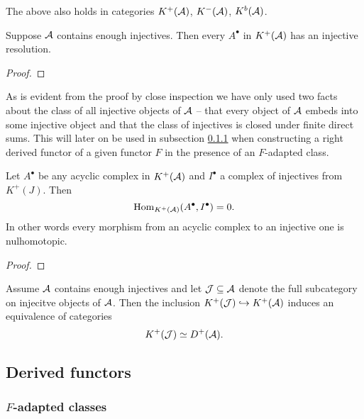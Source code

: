 The above also holds in categories $K^+(\mathcal A)$, $K^-(\mathcal A)$, $K^b(\mathcal A)$.

\begin{proposition}
    \label{injective resolution}
    Suppose $\mathcal A$ contains enough injectives. Then every $A^\bullet$ in $K^+(\mathcal A)$ has an injective resolution.
\end{proposition}

\begin{proof}
    
\end{proof}

\begin{remark}
    As is evident from the proof by close inspection we have only used two facts about the class of all injective objects of $\mathcal A$ -- that every object of $\mathcal A$ embeds into some injective object and that the class of injectives is closed under finite direct sums. This will later on be used in subsection \ref{Subsection on F-adapted classes} when constructing a right derived functor of a given functor $F$ in the presence of an $F$-adapted class.
\end{remark}

\begin{lemma}
    Let $A^\bullet$ be any acyclic complex in $K^+(\mathcal A)$ and $I^\bullet$ a complex of injectives from $K^+(J)$. Then
    \[
        \operatorname{Hom}_{K^+(\mathcal A)}(A^\bullet, I^\bullet) = 0.
    \]
    In other words every morphism from an acyclic complex to an injective one is nulhomotopic.
\end{lemma}

\begin{proof}
    
\end{proof}

\begin{theorem}
    Assume $\mathcal A$ contains enough injectives and let $\mathcal J \subseteq \mathcal A$ denote the full subcategory on injecitve objects of $\mathcal A$. Then the inclusion $K^+(\mathcal J) \hookrightarrow K^+(\mathcal A)$ induces an equivalence of categories
    \[
        K^+(\mathcal J) \simeq D^+(\mathcal A).
    \]
\end{theorem}

\subsection{Derived functors}

\subsubsection{$F$-adapted classes}
\label{Subsection on F-adapted classes}

